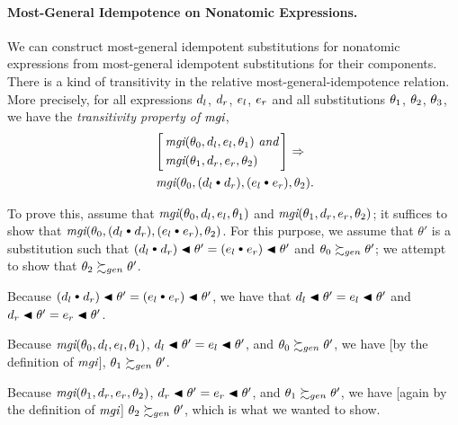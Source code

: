 \documentclass[runningheads]{llncs}
\DeclareMathOperator{\uand}{\emph{and}\,}
\DeclareMathOperator{\uimplies}{\Rightarrow}
\DeclareMathOperator{\mgi}{\emph{mgi}}
\begin{document}
  \paragraph{Most-General Idempotence on Nonatomic Expressions.} We can construct most-general idempotent substitutions for nonatomic expressions from most-general idempotent substitutions for their components. There is a kind of transitivity in the relative most-general-idempotence relation.
  More precisely, for all expressions $d_{l}$, $d_{r}$, $e_{l}$, $e_{r}$ and all substitutions $\theta_{1}$, $\theta_{2}$, $\theta_{3}$, we have the \emph{transitivity property of $\mgi$},
   \begin{alignat*}{1}
 &\left[\begin{aligned}
  &\mgi (\thet{0}, \d{l}, \e{l}, \thet{1})
  \, \uand \\
   &\mgi (\thet{1}, \d{r}, \e{r}, \thet{2}) 
   \end{aligned}\right] \, \uimplies\\
   &\mgi(\thet{0}, (\d{l} {\cons} \d{r}), (\e{l} {\cons} \e{r}), \thet{2}). 
  \end{alignat*} 
  

   \noindent To prove this, assume that ${\mgi}(\thet{0}, \d{l}, \e{l}, \thet{1})$ and ${\mgi}(\thet{1}, \d{r}, \e{r}, \thet{2}) $; it suffices to show that ${\mgi}(\thet{0}, (\d{l} {\cons} \d{r}), (\e{l} {\cons} \e{r}), \thet{2})$.  For this purpose, we assume  that $\theta'$ is a substitution such that $(\d{l} {\cons} \d{r}) \apply \theta' = (\e{l} {\cons} \e{r}) \apply \theta'$ and $\theta_{0} \succsim_{gen} \theta'$; we attempt to show that $\theta_{2} \succsim_{gen} \theta'$.
   
   Because  $(\d{l} {\cons} \d{r}) \apply \theta' = (\e{l} {\cons} \e{r}) \apply \theta'$, we have that  $d_{l} \blacktriangleleft \theta' = e_{l} \blacktriangleleft \theta'$ and  $d_{r} \blacktriangleleft \theta' = e_{r} \blacktriangleleft \theta'$.
   
   Because ${\mgi}(\thet{0}, \d{l}, \e{l}, \thet{1})$, $d_{l} \blacktriangleleft \theta' = e_{l} \blacktriangleleft \theta'$, and $\theta_{0} \succsim_{gen} \theta'$, we have [by the definition of $\mgi$], $\theta_{1} \succsim_{gen} \theta'$.
   
   Because ${\mgi} (\thet{1}, \d{r}, \e{r}, \thet{2})$, $d_{r} \blacktriangleleft \theta' = e_{r} \blacktriangleleft \theta'$, and $\theta_{1} \succsim_{gen} \theta'$, we have [again by the definition of $\mgi$] $\theta_{2} \succsim_{gen} \theta'$, which is what we wanted to show.
   
\end{document}
